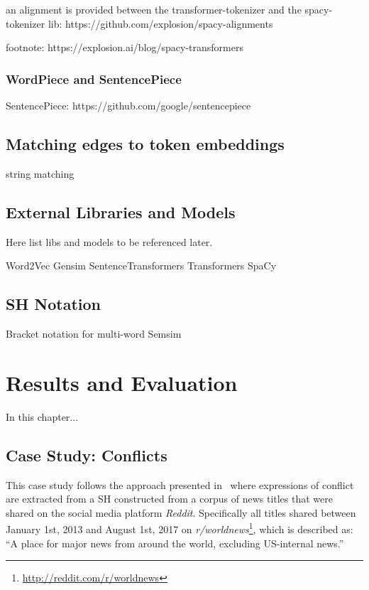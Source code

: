 \documentclass[11pt]{scrreprt}
\begin{document}
an alignment is provided between the transformer-tokenizer and the spacy-tokenizer
lib: https://github.com/explosion/spacy-alignments

footnote: https://explosion.ai/blog/spacy-transformers


\subsection{WordPiece and SentencePiece}

SentencePiece: https://github.com/google/sentencepiece



\section{Matching edges to token embeddings}
string matching


\section{External Libraries and Models}
Here list libs and models to be referenced later.

Word2Vec
Gensim
SentenceTransformers
Transformers
SpaCy




\section{SH Notation}
Bracket notation for multi-word Semsim



\chapter{Results and Evaluation}
In this chapter...

\section{Case Study: Conflicts}
This case study follows the approach presented in \cite[p.~22]{menezes_semantic_2021} where expressions of conflict are extracted from a SH constructed from a corpus of news titles that were shared on the social media platform \textit{Reddit}. Specifically all titles shared between January 1st, 2013 and August 1st, 2017 on \textit{r/worldnews}\footnote{\url{http://reddit.com/r/worldnews}}, which is described as: “A place for major news from around the world, excluding US-internal news.”
\end{document}
